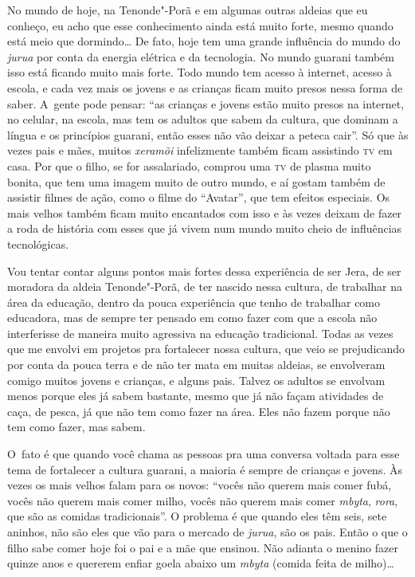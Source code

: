 No mundo de hoje, na Tenonde"-Porã e em algumas outras aldeias que eu
conheço, eu acho que esse conhecimento ainda está muito forte, mesmo
quando está meio que dormindo\ldots{} De fato, hoje tem uma grande
influência do mundo do \emph{jurua} por conta da energia elétrica e da
tecnologia. No mundo guarani também isso está ficando muito mais forte.
Todo mundo tem acesso à internet, acesso à escola, e cada vez mais os
jovens e as crianças ficam muito presos nessa forma de saber. A~gente
pode pensar: ``as crianças e jovens estão muito presos na internet, no
celular, na escola, mas tem os adultos que sabem da cultura, que
dominam a língua e os princípios guarani, então esses não vão deixar a
peteca cair''. Só que às vezes pais e mães, muitos \emph{xeramõi} infelizmente
também ficam assistindo \textsc{tv} em casa. Por que o filho, se for
assalariado, comprou uma \textsc{tv} de plasma muito bonita, que tem uma imagem
muito de outro mundo, e aí gostam também de assistir filmes de ação,
como o filme do ``Avatar'', que tem efeitos especiais. Os mais velhos
também ficam muito encantados com isso e às vezes deixam de fazer a
roda de história com esses que já vivem num mundo muito cheio de
influências tecnológicas. 

Vou tentar contar alguns pontos mais fortes dessa experiência de ser
Jera, de ser moradora da aldeia Tenonde"-Porã, de ter nascido nessa
cultura, de trabalhar na área da educação, dentro da pouca experiência
que tenho de trabalhar como educadora, mas de sempre ter pensado em como
fazer com que a escola não interferisse de maneira muito agressiva na
educação tradicional. Todas as vezes que me envolvi em projetos pra
fortalecer nossa cultura, que veio se prejudicando por conta da pouca
terra e de não ter mata em muitas aldeias, se envolveram comigo muitos
jovens e crianças, e alguns pais. Talvez os adultos se envolvam menos
porque eles já sabem bastante, mesmo que já não façam atividades de
caça, de pesca, já que não tem como fazer na área. Eles não fazem
porque não tem como fazer, mas sabem.

O~fato é que quando você chama as pessoas pra uma conversa voltada para
esse tema de fortalecer a cultura guarani, a maioria é sempre de
crianças e jovens. Às vezes os mais velhos falam para os novos: ``vocês
não querem mais comer fubá, vocês não querem mais comer milho, vocês
não querem mais comer \emph{mbyta}, \emph{rora}, que são as comidas tradicionais''. O
problema é que quando eles têm seis, sete aninhos, não são eles que vão
para o mercado de \emph{jurua}, são os pais. Então o que o filho sabe comer
hoje foi o pai e a mãe que ensinou. Não adianta o menino fazer quinze
anos e quererem enfiar goela abaixo um \emph{mbyta} (comida feita de milho)\ldots{}

